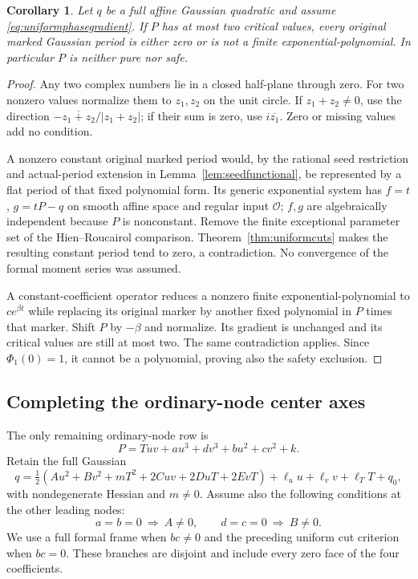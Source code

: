 \documentclass[11pt]{article}
\newtheorem{corollary}[theorem]{Corollary}
\theoremstyle{definition}\newtheorem{definition}[theorem]{Definition}
\theoremstyle{remark}\newtheorem{remark}[theorem]{Remark}
\begin{document}
\begin{corollary}\label{cor:twocriticalvalues}
Let $q$ be a full affine Gaussian quadratic and assume
\eqref{eq:uniformphasegradient}. If $P$ has at most two critical
values, every original marked Gaussian period is either zero or
is not a finite exponential-polynomial. In particular $P$ is
neither pure nor safe.
\end{corollary}
\begin{proof}
Any two complex numbers lie in a closed half-plane through zero.
For two nonzero values normalize them to $z_1,z_2$ on the unit
circle. If $z_1+z_2\ne0$, use the direction
$-\overline{z_1+z_2}/|z_1+z_2|$; if their sum is zero, use
$i\overline{z_1}$. Zero or missing values add no condition.

A nonzero constant original marked period would, by the rational
seed restriction and actual-period extension in
Lemma~\ref{lem:seedfunctional}, be represented by a flat period
of that fixed polynomial form. Its generic exponential system
has $f=t$, $g=tP-q$ on smooth affine space and regular input
$\mathcal O$; $f,g$ are algebraically independent because $P$
is nonconstant. Remove the finite exceptional parameter set of
the Hien--Roucairol comparison. Theorem~\ref{thm:uniformcuts}
makes the resulting constant period tend to zero, a contradiction.
No convergence of the formal moment series was assumed.

A constant-coefficient operator reduces a nonzero finite
exponential-polynomial to $c e^{\beta t}$ while replacing its
original marker by another fixed polynomial in $P$ times that
marker. Shift $P$ by $-\beta$ and normalize. Its gradient is
unchanged and its critical values are still at most two. The
same contradiction applies. Since $\Phi_1(0)=1$, it cannot be
a polynomial, proving also the safety exclusion.
\end{proof}

\subsection{Completing the ordinary-node center axes}
\label{sec:ordinaryaxes}

The only remaining ordinary-node row is
\begin{equation}\label{eq:ordinaryaxes}
 P=Tuv+a u^3+d v^3+b u^2+c v^2+k.
\end{equation}
Retain the full Gaussian
\[ q=\tfrac12(Au^2+Bv^2+mT^2+2Cuv+2DuT+2EvT)+\ell_u u+\ell_v v+\ell_TT+q_0,\]
with nondegenerate Hessian and $m\ne0$. Assume also the following
conditions at the other leading nodes:
\[
 a=b=0\ \Longrightarrow\ A\ne0,\qquad
 d=c=0\ \Longrightarrow\ B\ne0.
\]
We use a full formal frame when $bc\ne0$ and the preceding
uniform cut criterion when $bc=0$. These branches are disjoint
and include every zero face of the four coefficients.
\end{document}
